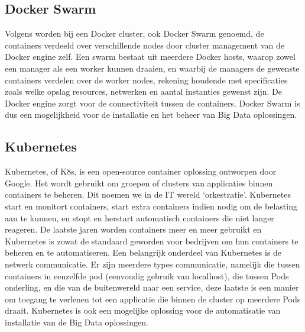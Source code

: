 \subsection{Docker Swarm}
Volgens \textcite{Docker2023b} worden bij een Docker cluster, ook Docker Swarm genoemd, de containers verdeeld over verschillende nodes door cluster management van de Docker engine zelf. Een swarm bestaat uit meerdere Docker hosts, waarop zowel een manager als een worker kunnen draaien, en waarbij de managers de gewenste containers verdelen over de worker nodes, rekening houdende met specificaties zoals welke opslag resources, netwerken en aantal instanties gewenst zijn. De Docker engine zorgt voor de connectiviteit tussen de containers.
\newline
\newline
Docker Swarm is dus een mogelijkheid voor de installatie en het beheer van Big Data oplossingen.
\newline
\newline

\subsection{Kubernetes}
Kubernetes, of K8s, is een open-source container oplossing ontworpen door Google. Het wordt gebruikt om groepen of clusters van applicaties binnen containers te beheren. Dit noemen we in de IT wereld ‘orkestratie’.
\newline
Kubernetes start en monitort containers, start extra containers indien nodig om de belasting aan te kunnen, en stopt en herstart automatisch containers die niet langer reageren.\autocite{Guthrie2022}
\newline
\newline
De laatste jaren worden containers meer en meer gebruikt en Kubernetes is zowat de standaard geworden voor bedrijven om hun containers te beheren en te automatiseren.
\autocite{Razorops2022}
\newline
\newline
Een belangrijk onderdeel van Kubernetes is de netwerk communicatie. Er zijn meerdere types communicatie, namelijk die tussen containers in eenzelfde pod (eenvoudig gebruik van localhost), die tussen Pods onderling, en die van de buitenwereld naar een service, deze laatste is een manier om toegang te verlenen tot een applicatie die binnen de cluster op meerdere Pods draait.
\autocite{Kubernetes2023a}
\autocite{Kubernetes2023b}
\newline
\newline
Kubernetes is ook een mogelijke oplossing voor de automatisatie van installatie van de Big Data oplossingen.


